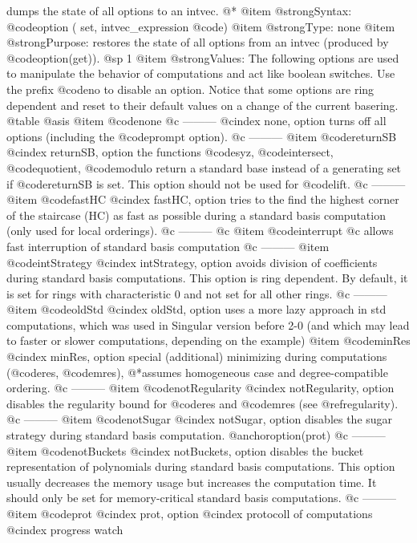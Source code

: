 {dumps the state of all options to an intvec.
@*
@item @strong{Syntax:}
@code{option ( set,} intvec_expression @code{)}
@item @strong{Type:}
none
@item @strong{Purpose:}
restores the state of all options from an intvec (produced by
@code{option(get)}).
@sp 1
@item @strong{Values:}
The following options are used to manipulate the behavior of
computations and act like boolean switches. Use the prefix @code{no} to
disable an option. Notice that some options are ring dependent and reset
to their default values on a change of the current basering.
@table @asis
@item @code{none}
@c ---------
@cindex none, option
turns off all options (including the @code{prompt} option).
@c ---------
@item @code{returnSB}
@cindex returnSB, option
the functions @code{syz}, @code{intersect}, @code{quotient},
@code{modulo} return a standard base instead of a generating set if
@code{returnSB} is set. This option should not be used for @code{lift}.
@c ---------
@item @code{fastHC}
@cindex fastHC, option
tries to the find the highest corner of the staircase (HC) as fast as
possible during a standard basis computation (only used for local
orderings).
@c ---------
@c @item @code{interrupt}
@c allows fast interruption of standard basis computation
@c ---------
@item @code{intStrategy}
@cindex intStrategy, option
avoids division of coefficients during standard basis
computations. This option is ring dependent. By default, it is set for
rings with characteristic 0 and not set for all other rings.
@c ---------
@item @code{oldStd}
@cindex oldStd, option
uses a more lazy approach in std computations,
which was used in Singular version before 2-0
(and which may lead to faster or slower computations, depending on the example)
@item @code{minRes}
@cindex minRes, option
special (additional) minimizing during computations (@code{res}, @code{mres}),
@*assumes homogeneous case and degree-compatible ordering.
@c ---------
@item @code{notRegularity}
@cindex notRegularity, option
disables the regularity bound for @code{res} and @code{mres} (see
@ref{regularity}).
@c ---------
@item @code{notSugar}
@cindex notSugar, option
disables the sugar strategy during standard basis computation.
@anchor{option(prot)}
@c ---------
@item @code{notBuckets}
@cindex notBuckets, option
disables the bucket representation of polynomials during standard basis
computations. This option usually decreases the memory usage but
increases the computation time. It should only be set for
memory-critical standard basis computations.
@c ---------
@item @code{prot}
@cindex prot, option
@cindex protocoll of computations
@cindex progress watch
}
